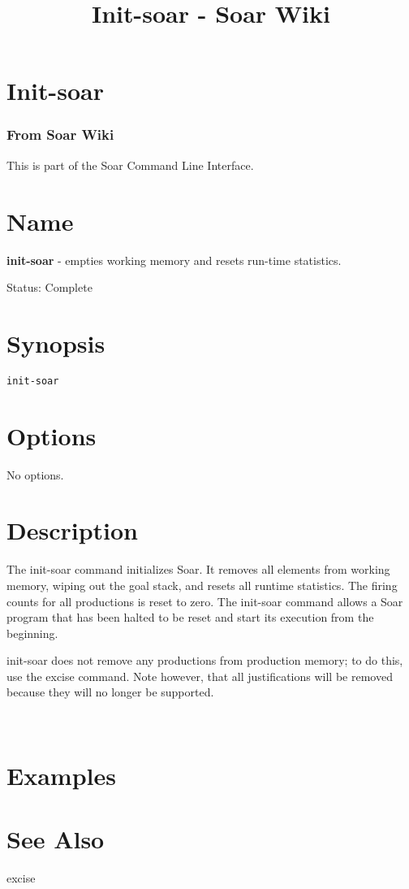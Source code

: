 \documentclass[10pt]{article}
\title{Init-soar - Soar Wiki}
\begin{document}
\section*{Init-soar}
\subsubsection*{From Soar Wiki}


 This is part of the Soar Command Line Interface. 
\section*{ Name }


 \textbf{init-soar}
 - empties working memory and resets run-time statistics. 


 Status: Complete
\section*{ Synopsis }
\begin{verbatim}
init-soar

\end{verbatim}
\section*{ Options }


 No options. 
\section*{ Description }


 The init-soar command initializes Soar. It removes all elements from working memory, wiping out the goal stack, and resets all runtime statistics. The firing counts for all productions is reset to zero. The init-soar command allows a Soar program that has been halted to be reset and start its execution from the beginning. 


 init-soar does not remove any productions from production memory; to do this, use the excise command. Note however, that all justifications will be removed because they will no longer be supported. 


 \\ 

\section*{ Examples }
\section*{ See Also }
\begin{description}
excise

\end{description}
\end{document}
